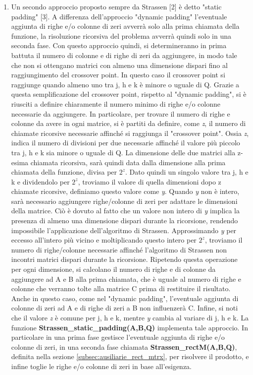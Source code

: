 \documentclass[10pt,a4paper,twoside]{tau-book}
\begin{document}
\begin{enumerate}
\item Un secondo approccio proposto sempre da Strassen [2] è detto "static padding" [3]. A differenza dell'approccio "dynamic padding" l'eventuale aggiunta di righe e/o colonne di zeri avverrà solo alla prima chiamata della funzione, la risoluzione ricorsiva del problema avverrà quindi solo in una seconda fase. Con questo approccio quindi, si determineranno in prima battuta il numero di colonne e di righe di zeri da aggiungere, in modo tale che non si ottengano matrici con almeno una dimensione dispari fino al raggiungimento del crossover point. In questo caso il crossover point si raggiunge quando almeno uno tra j, h e k è minore o uguale di Q. Grazie a questa semplificazione del crossover point, rispetto al "dynamic padding", si è riusciti a definire chiaramente il numero minimo di righe e/o colonne necessarie da aggiungere. In particolare, per trovare il numero di righe e colonne da avere in ogni matrice, si è partiti da definire, come \textit{z}, il numero di chiamate ricorsive necessarie affinché si raggiunga il "crossover point". Ossia \textit{z}, indica il numero di divisioni per due necessarie affinché il valore più piccolo tra j, h e k sia minore o uguale di Q. La dimensione delle due matrici alla z-esima chiamata ricorsiva, sarà quindi data dalla dimensione alla prima chiamata della funzione, divisa per $2^z$. Dato quindi un singolo valore tra j, h e k e dividendolo per $2^z$, troviamo il valore di quella dimensioni dopo z chiamate ricorsive, definiamo questo valore come \textit{y}. Quando \textit{y} non è intero, sarà necessario aggiungere righe/colonne di zeri per adattare le dimensioni della matrice. Ciò è dovuto al fatto che un valore non intero di \textit{y} implica la presenza di almeno una dimensione dispari durante la ricorsione, rendendo impossibile l'applicazione dell'algoritmo di Strassen. Approssimando \textit{y} per eccesso all'intero più vicino e moltiplicando questo intero per $2^z$, troviamo il numero di righe/colonne necessarie affinché l'algoritmo di Strassen non incontri matrici dispari durante la ricorsione. Ripetendo questa operazione per ogni dimensione, si calcolano il numero di righe e di colonne da aggiungere ad A e B alla prima chiamata, che è uguale al numero di righe e colonne che verranno tolte alla matrice C prima di restituire il risultato. Anche in questo caso, come nel "dynamic padding", l'eventuale aggiunta di colonne di zeri ad A e di righe di zeri a B non influenzerà C. Infine, si noti che il valore \textit{z} è comune per j, h e k, mentre \textit{y} cambia al variare di j, h e k. La funzione \textbf{Strassen\_static\_padding(A,B,Q)} implementa tale approccio. In particolare in una prima fase gestisce l'eventuale aggiunta di righe e/o colonne di zeri, in una seconda fase chiamata \textbf{Strassen\_rectM(A,B,Q)}, definita nella sezione \ref{subsec:ausiliarie_rect_mtrx}, per risolvere il prodotto, e infine toglie le righe e/o colonne di zeri in base all'esigenza.


\end{enumerate}
\end{document}
